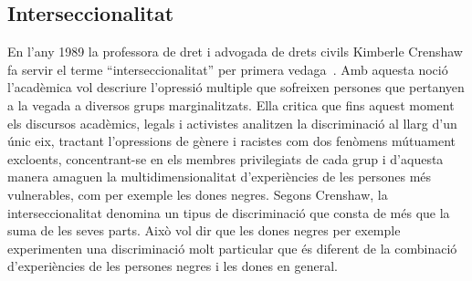 \begin{comment}
""Aquests nou[sic!] catalans no coneixen Catalunya: la seva tradició, la seva història, el seu art, la seva cultura, la seva literatura, els seus costums, el seu folklore... Tampoc en aquest aspece no coneicen la regió d'on procedeixen. Però jo pregutno: quants catalans hi ha que coneguin tot això que he dit? Del poble, cap. De les classes privilegiades, alguns. Però tot això ja és qüestió de cultura"" (p.17)

""Aquests nou[sic!] catalans parles català, el van aprendre sense adonar-se'n. Molts el parles de manera natural i quotidiana, perquè sí, i altres per afany de sentir-se catalans de debò"" (p.17)

""Parlen un català gruixut, groller i vulgar[...] Desconeixen la gramàtica catalana. No saben llegir en aquest idioma. Escriure'l, encara menys. Però no n'hi ha per a escandaltzar-se'n. Infinitat de catalans d'origen, que s'expressen en català, que parlen en català i que viuen en català, llegiexen en castellà i escriuen les seves cartes en castellà."" (p.18)

""Tota aquesta gent no s'adona de la seva aclimatació. "Són" catalans fins a cert punt. "No" són catalans, també fins a cert punt. No és una qüestió d'honor ni de principis."" (p.19)

"Aquells immigrants murcians no havien arribat a Catalunya com a colonitzadors. Tampoc, o molt febement, com a invasors o peoners. Havien vingut a treballar i a menjar, senzillament, perquè a la seva terra es morien de gana [...] Avui dia, tots s'han integrat, i alguns, ultrapassant o sobrepujant aquesta integració, s'han tornat furibunds catalanistes. [...] Aquesta esperiència pot demostrar o permetre d'esperar que amb els immigrants d'ara passarà el mateixo poc més o menys." (p.32)

"el que passa és que no acabem de decidir-nos a anomenar catalans els qui han nascut aquí de pares de fora" (p.34)

\end{comment}

\subsection{Interseccionalitat}
En l'any 1989 la professora de dret i advogada de drets civils Kimberle Crenshaw fa servir el terme ``interseccionalitat'' per primera vedaga~\autocite{Crenshaw1989}.
Amb aquesta noció l'acadèmica vol descriure l'opressió multiple que sofreixen persones que pertanyen a la vegada a diversos grups marginalitzats.
Ella critica que fins aquest moment els discursos acadèmics, legals i activistes analitzen la discriminació al llarg d'un únic eix,
tractant l'opressions de gènere i racistes com dos fenòmens mútuament excloents,
concentrant-se en els membres privilegiats de cada grup i d'aquesta manera amaguen la multidimensionalitat d'experiències de les persones més vulnerables, com per exemple les dones negres.
Segons Crenshaw, la interseccionalitat denomina un tipus de discriminació que consta de més que la suma de les seves parts.
Això vol dir que les dones negres per exemple experimenten una discriminació molt particular que és diferent de la combinació d'experiències de les persones negres i les dones en general.

